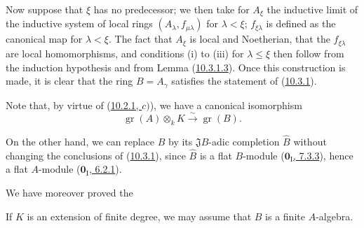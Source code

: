 \begin{env}[10.3.1.4]
Now suppose that $\xi$ has no predecessor; we then take
for $A_\xi$ the inductive limit of the inductive system of local rings
$(A_\lambda,f_{\mu\lambda})$ for $\lambda<\xi$; $f_{\xi\lambda}$ is defined
as the canonical map for $\lambda<\xi$. The fact that $A_\xi$ is
local and Noetherian, that the $f_{\xi\lambda}$ are local homomorphisms,
and conditions (i) to (iii) for $\lambda\leq\xi$
then follow from the induction hypothesis and from Lemma
(\hyperref[0.10.3.1.3]{10.3.1.3}). Once this construction is made, it is clear
that the ring $B=A_\gamma$ satisfies the statement of
(\hyperref[0.10.3.1]{10.3.1}).
\end{env}

Note that, by virtue of (\hyperref[0.10.2.1]{10.2.1, $c)$}), we have a
canonical isomorphism
\[
\label{0.10.3.1.5}
  \operatorname{gr}(A)\otimes_k K\xrightarrow{\sim}\operatorname{gr}(B).
  \tag{10.3.1.5}
\]

On the other hand, we can replace $B$ by its $\mathfrak J B$-adic completion
$\widehat B$ without changing the conclusions of
(\hyperref[0.10.3.1]{10.3.1}), since $\widehat B$ is a flat $B$-module
(\hyperref[0.7.3.3]{$\mathbf{0}_{\mathrm I}$, 7.3.3}), hence a flat $A$-module
(\hyperref[0.6.2.1]{$\mathbf{0}_{\mathrm I}$, 6.2.1}).

We have moreover proved the

\begin{corollary}[10.3.2]
\label{0.10.3.2}
If $K$ is an extension of finite degree, we may assume that $B$ is a
finite $A$-algebra.
\end{corollary}

